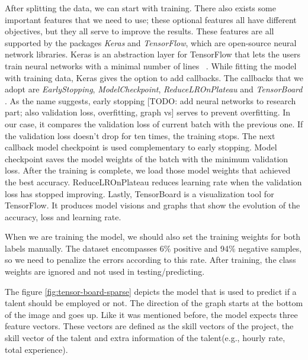 After splitting the data, we can start with training. There also exists some important features that we need to use; these optional features all have different objectives, but they all serve to improve the results. These features are all supported by the packages \textit{Keras} and \textit{TensorFlow}, which are open-source neural network libraries. Keras is an abstraction layer for TensorFlow that lets the users train neural networks with a minimal number of lines ~\parencite{chollet2018deep}. While fitting the model with training data, Keras gives the option to add callbacks. The callbacks that we adopt are \textit{EarlyStopping}, \textit{ModelCheckpoint},  \textit{ReduceLROnPlateau} and \textit{TensorBoard} . As the name suggests, early stopping [TODO: add neural networks to research part; also validation loss, overfitting, graph vs] serves to prevent overfitting. In our case, it compares the validation loss of current batch with the previous one. If the validation loss doesn't drop for ten times, the training stops. The next callback model checkpoint is used complementary to early stopping. Model checkpoint saves the model weights of the batch with the minimum validation loss. After the training is complete, we load those model weights that achieved the best accuracy. ReduceLROnPlateau reduces learning rate when the validation loss has stopped improving. Lastly, TensorBoard is a visualization tool for TensorFlow. It produces model visions and graphs that show the evolution of the accuracy, loss and learning rate. 

When we are training the model, we should also set the training weights for both labels manually. The dataset encompasses 6\% positive and 94\% negative samples, so we need to penalize the errors according to this rate. After training, the class weights are ignored and not used in testing/predicting.


The figure \ref{fig:tensor-board-sparse}  depicts the model that is used to predict if a talent should be employed or not. The direction of the graph starts at the bottom of the image and goes up. Like it was mentioned before, the model expects three feature vectors. These vectors are defined as the skill vectors of the project, the skill vector of the talent and extra information of the talent(e.g., hourly rate, total experience). 

